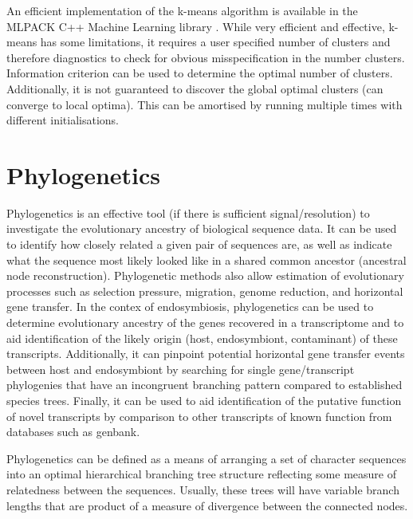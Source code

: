 An efficient implementation of the k-means algorithm is available in the MLPACK C++ Machine Learning library \citep{mlpack2013}.
While very efficient and effective, k-means has some limitations, it requires a user specified number of clusters
and therefore diagnostics to check for obvious misspecification in the number clusters.  Information criterion
can be used to determine the optimal number of clusters.
Additionally, it is not guaranteed
to discover the global optimal clusters (can converge to local optima).  This can be amortised by running multiple times 
with different initialisations.

\section{Phylogenetics}

Phylogenetics is an effective tool (if there is sufficient signal/resolution) 
to investigate the evolutionary ancestry of biological sequence data.
It can be used to identify how closely related a given pair of sequences are, as
well as indicate what the sequence most likely looked like in a shared common
ancestor (ancestral node reconstruction). Phylogenetic methods also allow estimation
of evolutionary processes such as selection pressure,
migration, genome reduction, and horizontal gene transfer.
In the contex of endosymbiosis, phylogenetics can be used to determine evolutionary ancestry of 
the genes recovered in a transcriptome and to aid identification of the likely origin 
(host, endosymbiont, contaminant) of these transcripts. Additionally, it can pinpoint
potential horizontal gene transfer events between host and endosymbiont by searching for single 
gene/transcript phylogenies that have an incongruent branching pattern
compared to established species trees.  Finally, it can be used to aid identification of the putative function 
of novel transcripts by comparison to other transcripts of known function 
from databases such as genbank. 


Phylogenetics can be defined as a means of arranging a set of character sequences into an optimal hierarchical
branching tree structure reflecting some measure of relatedness 
between the sequences. Usually, these trees will have variable
branch lengths that are product of a measure of divergence between the connected nodes.

